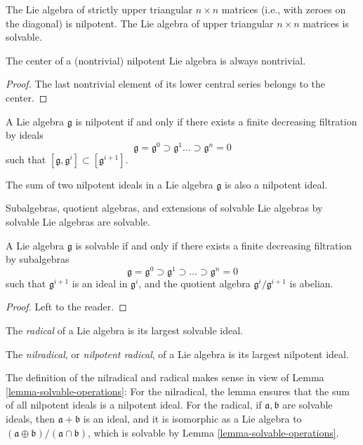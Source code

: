 \begin{example}
 \label{example-nilpotent-solvable}
The Lie algebra of strictly upper triangular $n\times n$ matrices (i.e., with zeroes on the diagonal) is nilpotent. The Lie algebra of upper triangular $n\times n$ matrices is solvable.
\end{example}

\begin{lemma}
 \label{lemma-nilpotent-center}
 The center of a (nontrivial) nilpotent Lie algebra is always nontrivial.
\end{lemma}
\begin{proof}
 The last nontrivial element of its lower central series belongs to the center.
\end{proof}




\begin{lemma}
 \label{lemma-solvable-operations}
A Lie algebra $\mathfrak g$ is nilpotent if and only if there exists a finite decreasing filtration by ideals 
$$ \mathfrak g = \mathfrak g^0 \supset \mathfrak g^1 \dots \supset \mathfrak g^n=0$$
such that $[\mathfrak g, \mathfrak g^i]\subset [\mathfrak g^{i+1}]$.

The sum of two nilpotent ideals in a Lie algebra $\mathfrak g$ is also a nilpotent ideal.
 
Subalgebras, quotient algebras, and extensions of solvable Lie algebras by solvable Lie algebras are solvable.
  
A Lie algebra $\mathfrak g$ is solvable if and only if there exists a finite decreasing filtration by subalgebras
$$ \mathfrak g = \mathfrak g^0 \supset \mathfrak g^1 \supset \dots \supset \mathfrak g^n =0$$
such that $\mathfrak g^{i+1}$ is an ideal in $\mathfrak g^i$, and the quotient algebra $\mathfrak g^i/\mathfrak g^{i+1}$ is abelian.
\end{lemma}

\begin{proof}
 Left to the reader.
\end{proof}



\begin{definition}
 \label{definition-radical}
The {\it radical} of a Lie algebra is its largest solvable ideal.

The {\it nilradical}, or {\it nilpotent radical}, of a Lie algebra is its largest nilpotent ideal.
\end{definition}

The definition of the nilradical and radical makes sense in view of Lemma \ref{lemma-solvable-operations}: For the nilradical, the lemma ensures that the sum of all nilpotent ideals is a nilpotent ideal. For the radical, if $\mathfrak a, \mathfrak b$ are solvable ideals, then $\mathfrak a + \mathfrak b$ is an ideal, and it is isomorphic as a Lie algebra to $(\mathfrak a \oplus \mathfrak b)/(\mathfrak a\cap \mathfrak b)$, which is solvable by Lemma \ref{lemma-solvable-operations}.

